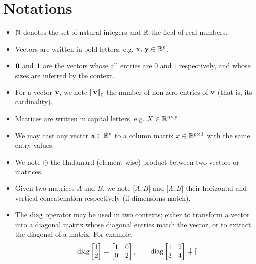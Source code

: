 \cleardoublepage
\chapter*{Notations}

\begin{itemize}
    \item $\mathbb{N}$ denotes the set of natural integers and $\mathbb{R}$ the field of real numbers.
    \item Vectors are written in bold letters, e.g. $\mathbf{x},\, \mathbf{y} \in \mathbb{R}^p$.
    \item $\mathbf{0}$ and $\mathbf{1}$ are the vectors whose all entries are $0$ and $1$ respectively,
        and whose sizes are inferred by the context.
    \item For a vector $\mathbf{v}$, we note $\left\lVert\mathbf{v}\right\rVert_0$ the number of non-zero entries of $\mathbf{v}$ (that is, its cardinality).
    \item Matrices are written in capital letters, e.g. $X \in \mathbb{R}^{n \times p}$.
    \item We may cast any vector $\mathbf{x} \in \mathbb{R}^p$ to a column matrix $x \in \mathbb{R}^{p \times 1}$ with the same entry values.
    \item We note $\odot$ the Hadamard (element-wise) product between two vectors or matrices.
    \item Given two matrices $A$ and $B$, we note $\big[ A, B \big]$ and $\big[ A; B \big]$ their horizontal and
        vertical concatenation respectively (if dimensions match).
    \item The $\operatorname*{diag}$ operator may be used in two contexts;
    either to transform a vector into a diagonal matrix whose diagonal entries match the vector,
    or to extract the diagonal of a matrix.
    For example,
    \begin{equation*}
        \operatorname*{diag} \begin{bmatrix}
                  1\\
                  2
        \end{bmatrix}
        =
        \begin{bmatrix}
            1 & 0\\
            0 & 2
        \end{bmatrix}
        ,\qquad
        \operatorname*{diag} \begin{bmatrix}
                  1 & 2\\
                  3 & 4
        \end{bmatrix}
        =
        \begin{bmatrix}

\end{bmatrix}
\end{equation*}
\end{itemize}
